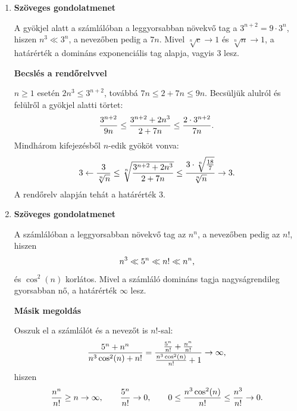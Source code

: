 \documentclass[11pt]{scrartcl}
\begin{document}
\begin{enumerate}
	\item \textbf{Szöveges gondolatmenet}

	      A gyökjel alatt a számlálóban a leggyorsabban növekvő tag a
	      $3^{n + 2} = 9 \cdot 3^n$, hiszen $n^3 \ll 3^n$, a nevezőben pedig a
	      $7n$. Mivel $\sqrt[n]{c} \to 1$ és $\sqrt[n]{n} \to 1$, a határérték a
	      domináns exponenciális tag alapja, vagyis $3$ lesz.

	      \textbf{Becslés a rendőrelvvel}

	      $n \ge 1$ esetén $2n^3 \le 3^{n + 2}$, továbbá
	      $7n \le 2 + 7n \le 9n$. Becsüljük alulról és felülről a gyökjel
	      alatti törtet:
	      \[
		      \frac{3^{n + 2}}{9n}
		      \le \frac{3^{n + 2} + 2n^3}{2 + 7n}
		      \le \frac{2 \cdot 3^{n + 2}}{7n}
		      \text.
	      \]
	      Mindhárom kifejezésből $n$-edik gyököt vonva:
	      \[
		      3
		      \leftarrow \frac{3}{\sqrt[n]{n}}
		      \le \sqrt[n]{\frac{3^{n + 2} + 2n^3}{2 + 7n}}
		      \le \frac{3 \cdot \sqrt[n]{\frac{18}{7}}}{\sqrt[n]{n}}
		      \to 3
		      \text.
	      \]
	      A rendőrelv alapján tehát a határérték $3$.

	\item \textbf{Szöveges gondolatmenet}

	      A számlálóban a leggyorsabban növekvő tag az $n^n$, a nevezőben pedig
	      az $n!$, hiszen
	      \[
		      n^3 \ll 5^n \ll n! \ll n^n
		      \text,
	      \]
	      és $\cos^2(n)$ korlátos. Mivel a számláló domináns tagja
	      nagyságrendileg gyorsabban nő, a határérték $\infty$ lesz.

	      \textbf{Másik megoldás}

	      Osszuk el a számlálót és a nevezőt is $n!$-sal:
	      \[
		      \frac{5^n + n^n}{n^3 \cos^2(n) + n!}
		      = \frac{
			      \frac{5^n}{n!} + \frac{n^n}{n!}
		      }{
			      \frac{n^3 \cos^2(n)}{n!} + 1
		      }
		      \to \infty
		      \text,
	      \]
	      hiszen
	      \[
		      \frac{n^n}{n!} \ge n \to \infty,
		      \qquad
		      \frac{5^n}{n!} \to 0,
		      \qquad
		      0 \le \frac{n^3 \cos^2(n)}{n!} \le \frac{n^3}{n!} \to 0
		      \text.
	      \]
\end{enumerate}
\end{document}
